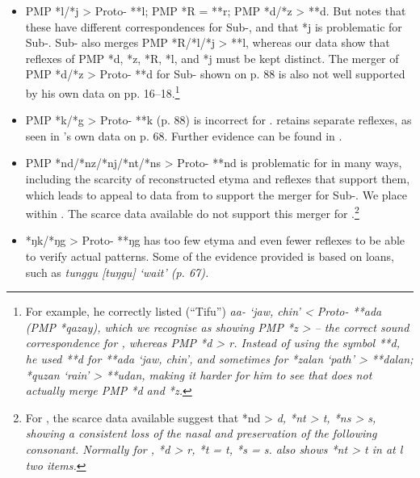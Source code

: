 \begin{itemize}

\item PMP *l/*j > Proto- **l; PMP *R = **r; PMP *d/*z > **d.
But \citet[17]{Stresemann1927} notes that these have different
correspondences for Sub-, and that *j is problematic for Sub-.
Sub- also merges PMP *R/*l/*j > **l,
whereas our  data show that reflexes of PMP *d,
*z, *R, *l, and *j must be kept distinct.
The merger of PMP *d/*z > Proto- **d for Sub- shown on p.
88 is also not well supported by his own data on pp.
16--18.\footnote{
		For example, he correctly listed  (``Tifu'')
		\it{aa-} ‘jaw, chin’ < Proto- **ada (PMP *qazay),
		which we recognise as showing PMP *z >  {\0} -- the correct
		sound correspondence for ,
		whereas PMP *d >  \it{r}.
		Instead of using the symbol **d{\Q},
		he used **d for **ada ‘jaw,
		chin’, and sometimes for *zalan ‘path’ > **dalan;
		*quzan ‘rain’ > **udan,
		making it harder for him to see that  does not
		actually merge PMP *d
		and *z.}
\item PMP *k/*g > Proto- **k (p.
88) is incorrect for .
 retains separate reflexes,
as seen in \citeauthor{Stresemann1927}'s own data on p. 68.
Further evidence can be found in \citet{GrimesGrimes2020}.

\item PMP *nd/*nz/*nj/*nt/*ns > Proto- **nd is problematic for
 in many ways,
including the scarcity of reconstructed etyma
and reflexes that support them,
which leads \citeauthor{Stresemann1927} to appeal to data from  to support
the merger for Sub-.
We place  within .
The scarce data available do not support this merger for
.\footnote{
		For , the scarce data available suggest that *nd > \it{d},
		*nt > \it{t}, *ns > \it{s},
		showing a consistent loss of the nasal
		and preservation of the following consonant.
		Normally for , *d > \it{r},
		*t = \it{t}, *s = \it{s}.
		 also shows *nt > \it{t} in at l two items.}

\item *ŋk/*ŋg > Proto- **ŋg has too few etyma
and even fewer reflexes to be able to verify actual patterns.
Some of the evidence provided is based on  loans,
such as \it{tunggu} [tuŋgu] ‘wait’ (p. 67).


\end{itemize}
